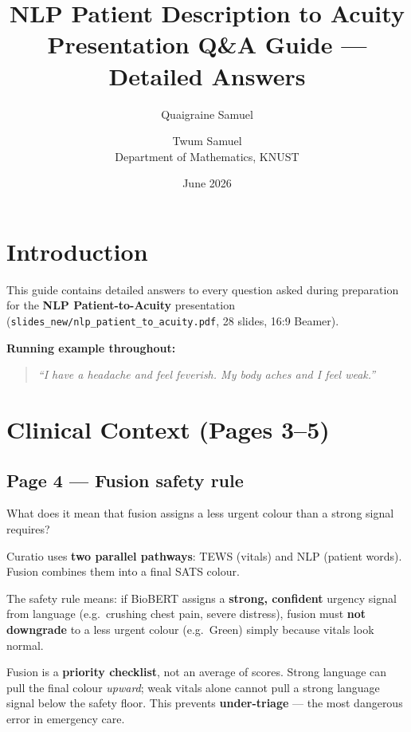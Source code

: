 \documentclass[11pt]{article}
\title{\textbf{NLP Patient Description to Acuity}\\[0.4em]
\large Presentation Q\&A Guide --- Detailed Answers}
\author{Quaigraine Samuel \and Twum Samuel\\Department of Mathematics, KNUST}
\date{June 2026}
\begin{document}
\maketitle
\tableofcontents
\newpage

\section{Introduction}

This guide contains detailed answers to every question asked during preparation for the \textbf{NLP Patient-to-Acuity} presentation (\texttt{slides\_new/nlp\_patient\_to\_acuity.pdf}, 28 slides, 16:9 Beamer).

\textbf{Running example throughout:}
\begin{quote}
\textit{``I have a headache and feel feverish. My body aches and I feel weak.''}
\end{quote}

\section{Clinical Context (Pages 3--5)}

\subsection{Page 4 --- Fusion safety rule}

\begin{questionbox}
What does it mean that fusion assigns a less urgent colour than a strong signal requires?
\end{questionbox}

\begin{answerbox}
Curatio uses \textbf{two parallel pathways}: TEWS (vitals) and NLP (patient words). Fusion combines them into a final SATS colour.

The safety rule means: if BioBERT assigns a \textbf{strong, confident} urgency signal from language (e.g.\ crushing chest pain, severe distress), fusion must \textbf{not downgrade} to a less urgent colour (e.g.\ Green) simply because vitals look normal.

Fusion is a \textbf{priority checklist}, not an average of scores. Strong language can pull the final colour \textit{upward}; weak vitals alone cannot pull a strong language signal below the safety floor. This prevents \textbf{under-triage} --- the most dangerous error in emergency care.
\end{answerbox}
\end{document}
